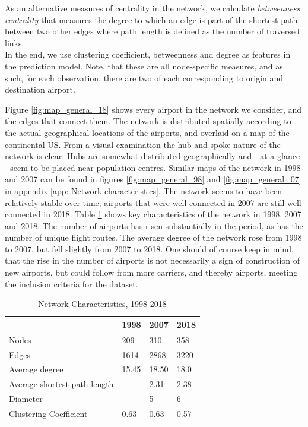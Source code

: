 As an alternative measures of centrality in the network, we calculate \textit{betweenness centrality} that measures the degree to which an edge is part of the shortest path between two other edges where path length is defined as the number of traversed links. \\
In the end, we use clustering coefficient, betweenness and degree as features in the prediction model. Note, that these are all node-specific measures, and as such, for each observation, there are two of each corresponding to origin and destination airport. 

Figure \ref{fig:map_general_18} shows every airport in the network we consider, and the edges that connect them. The network is distributed spatially according to the actual geographical locations of the airports, and overlaid on a map of the continental US. From a visual examination the hub-and-spoke nature of the network is clear. Hubs are somewhat distributed geographically and - at a glance - seem to be placed near population centres. Similar maps of the network in 1998 and 2007 can be found in figures \ref{fig:map_general_98} and \ref{fig:map_general_07} in appendix \ref{app: Network characteristics}. The network seems to have been relatively stable over time; airports that were well connected in 2007 are still well connected in 2018. Table \ref{tab: temporal} shows key characteristics of the network in 1998, 2007 and 2018. The number of airports has risen substantially in the period, as has the number of unique flight routes. The average degree of the network rose from 1998 to 2007, but fell slightly from 2007 to 2018. One should of course keep in mind, that the rise in the number of airports is not necessarily a sign of construction of new airports, but could follow from more carriers, and thereby airports, meeting the inclusion criteria for the dataset.
\begin{table}[H]
\centering 
\caption{Network Characteristics, 1998-2018}
\label{tab: temporal}
\begin{tabular}{|l|l|l|l|}
\hline
\textbf{}                    & \textbf{1998} & \textbf{2007} & \textbf{2018} \\ \hline
Nodes                        & 209           & 310           & 358           \\
Edges                        & 1614          & 2868          & 3220          \\
Average degree               & 15.45         & 18.50         & 18.0          \\
Average shortest path length & -             & 2.31          & 2.38          \\ 
Diameter                     & -             & 5             & 6 
     \\
Clustering Coefficient       & 0.63          & 0.63          & 0.57          \\ \hline
\end{tabular}
\end{table}
